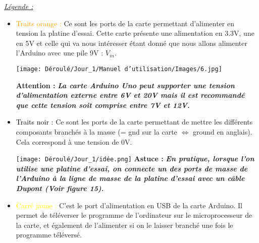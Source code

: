     \newpage
    
    \begin{flushleft}
    \underline{\textit{\large Légende :}}\vspace{0.4cm}

    \begin{itemize}
        \item \begin{flushleft}\textcolor{orange}{Traits orange :} Ce sont les ports de la carte permettant d'alimenter en tension la platine d'essai. Cette carte présente une alimentation en 3.3V, une en 5V et celle qui va nous intéresser étant donné que nous allons alimenter l'Arduino avec une pile 9V : $V_{in}$.\vspace{0.2cm}
        \end{flushleft}
        \begin{flushleft}
        \begin{multicols}{2}
        \texttt{[image: Déroulé/Jour\_1/Manuel d'utilisation/Images/6.jpg]}
    
        \columnbreak
    
        \textbf{\large Attention : }\textbf{\textit{ La carte Arduino Uno peut supporter une tension d'alimentation externe entre 6V et 20V mais il est recommandé que cette tension soit comprise entre 7V et 12V.}}\\\vspace{0.2cm}
        \end{multicols}
        \end{flushleft}
        
        \item \textcolor{black}{Traits noir :} Ce sont les ports de la carte permettant de mettre les différents composants branchés à la masse (= gnd sur la carte $\Leftrightarrow$ ground en anglais). Cela correspond à une tension de 0V.\vspace{0.2cm}
        
        \texttt{[image: Déroulé/Jour\_1/idée.png]}
        \textbf{\large Astuce : }\textbf{\textit{\large En pratique, lorsque l'on utilise une platine d'essai, on connecte un des ports de masse de l'Arduino à la ligne de masse de la platine d'essai avec un câble Dupont (Voir figure 15).}}\\\vspace{0.2cm}
        
        \item \textcolor{yellow}{Carré jaune :} C'est le port d'alimentation en USB de la carte Arduino. Il permet de téléverser le programme de l'ordinateur sur le microprocesseur de la carte, et également de l'alimenter si on le laisser branché une fois le programme téléversé.\\\vspace{0.2cm}
        

\end{itemize}
\end{flushleft}
